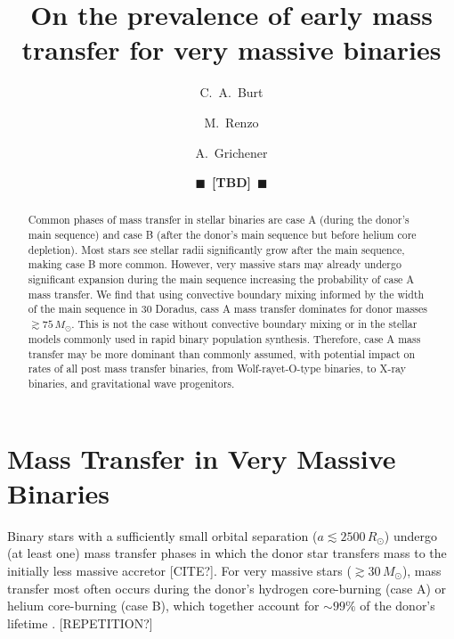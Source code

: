 \documentclass[twocolumn]{aastex63}
\newcommand{\todo}[1]{{\large $\blacksquare$~\textbf{\color{red}[#1]}}~$\blacksquare$}
\begin{document}
\title{On the prevalence of early mass transfer for very massive binaries}

\author[0009-0008-2061-4946]{C.~A.~Burt}

\author[0000-0002-6718-9472]{M.~Renzo}

\author[0000-0002-2215-1841]{A.~Grichener}

\author{\todo{TBD}}

\begin{abstract}
  Common phases of mass transfer in stellar binaries are case A
  (during the donor's main sequence) and case B (after the donor's
  main sequence but before helium core depletion). Most stars see
  stellar radii significantly grow after the main sequence, making
  case B more common. However, very massive stars may already undergo
  significant expansion during the main sequence increasing the
  probability of case A mass transfer. We find that using convective
  boundary mixing informed by the width of the main sequence in 30
  Doradus, cass A mass transfer dominates for donor masses
  $\gtrsim 75 \, M_{\odot}$. This is not the case without convective
  boundary mixing or in the stellar models commonly used in rapid
  binary population synthesis.  Therefore, case A mass transfer may be
  more dominant than commonly assumed, with potential impact on rates
  of all post mass transfer binaries, from Wolf-rayet-O-type binaries,
  to X-ray binaries, and gravitational wave progenitors.
\end{abstract}

\section{Mass Transfer in Very Massive Binaries}

Binary stars with a sufficiently small orbital separation
($a\lesssim2500\,R_{\odot}$) undergo (at least one) mass transfer
phases in which the donor star transfers mass to the initially less
massive accretor [CITE?]. For very massive stars
($ \gtrsim 30 \, M_{\odot}$), mass transfer most often occurs during
the donor's hydrogen core-burning (case A) or helium core-burning
(case B), which together account for $\sim99\%$ of the donor's
lifetime \citep{kippenhahn:67}. [REPETITION?]
\end{document}
